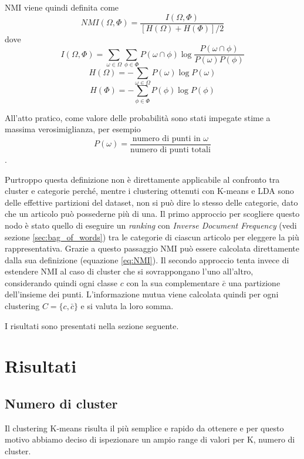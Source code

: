 \documentclass[
	11pt, %
	a4paper, %
	oneside, %
	headinclude,footinclude, %
	BCOR5mm, %
]{scrartcl}
\begin{document}
			NMI viene quindi definita come
			\begin{equation} \label{eq:NMI}
				NMI(\Omega, \Phi) = \frac
					{I(\Omega, \Phi)}
					{\left[ H(\Omega) + H(\Phi)\right] / 2}
			\end{equation}
			dove
			$$ I(\Omega, \Phi) =
					\sum_{\omega \in \Omega} \sum_{\phi \in \Phi}
						P(\omega \cap \phi) \log \frac {P(\omega \cap \phi)} {P(\omega) P(\phi)} $$
			$$ H(\Omega) = - \sum_{\omega \in \Omega} P(\omega) \log P(\omega) $$
				$$ H(\Phi) = - \sum_{\phi \in \Phi} P(\phi) \log P(\phi) $$

			All'atto pratico, come valore delle probabilità sono stati impegate stime a massima verosimiglianza, per esempio
			\begin{equation*}
				P(\omega) = \frac
					{ \text{numero di punti in }\omega }
					{ \text{numero di punti totali} }
			\end{equation*}.

			\smallbreak

			Purtroppo questa definizione non è direttamente applicabile al confronto tra cluster e categorie perché, mentre i clustering ottenuti con K-means e LDA sono delle effettive partizioni del dataset, non si può dire lo stesso delle categorie, dato che un articolo può possederne più di una.
			\smallbreak
			Il primo approccio per scogliere questo nodo è stato quello di eseguire un \emph{ranking} con \emph{Inverse Document Frequency} (vedi sezione \ref{sec:bag_of_words}) tra le categorie di ciascun articolo per eleggere la più rappresentativa.
			Grazie a questo passaggio NMI può essere calcolata direttamente dalla sua definizione (equazione \ref{eq:NMI}).
			\smallbreak
			Il secondo approccio tenta invece di estendere NMI al caso di cluster che si sovrappongano l'uno all'altro, considerando quindi ogni classe $c$ con la sua complementare $\bar{c}$ una partizione dell'insieme dei punti.
			L'informazione mutua viene calcolata quindi per ogni clustering $C = \{c, \bar{c}\}$ e si valuta la loro somma.
			
			\smallbreak
			I risultati sono presentati nella sezione seguente.

\section{Risultati}

	\subsection{Numero di cluster}
		Il clustering K-means risulta il più semplice e rapido da ottenere e per questo motivo abbiamo deciso di ispezionare un ampio range di valori per K, numero di cluster.
\end{document}

